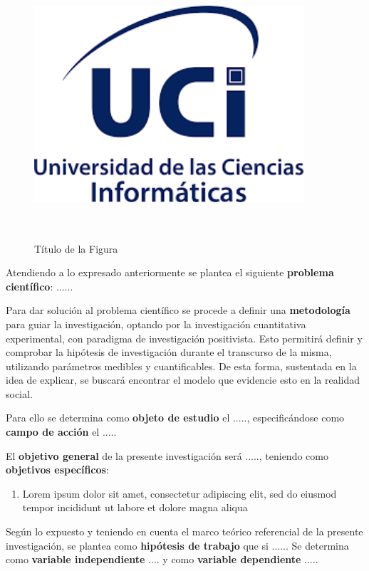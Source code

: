 \begin{figure}
	\centering
	\includegraphics[width=10cm,height=10cm]{Figuras/ucilogo.png}
	\caption{Título de la Figura}
	\label{fig:afigure}
\end{figure}

Atendiendo a lo expresado anteriormente se plantea el siguiente \textbf{problema científico}: ......

Para dar solución al problema científico se procede a definir una \textbf{metodología} para guiar la investigación, optando por la investigación cuantitativa experimental, con paradigma de investigación positivista. Esto permitirá definir y comprobar la hipótesis de investigación durante el transcurso de la misma, utilizando parámetros medibles y cuantificables. De esta forma, sustentada en la idea de explicar, se buscará encontrar el modelo que evidencie esto en la realidad social.

Para ello se determina como \textbf{objeto de estudio} el ....., especificándose como \textbf{campo de acción} el .....

El \textbf{objetivo general} de la presente investigación será ....., teniendo como \textbf{objetivos específicos}:
\begin{enumerate}
	\item Lorem ipsum dolor sit amet, consectetur adipiscing elit, sed do eiusmod tempor incididunt ut labore et dolore magna aliqua
\end{enumerate}

Según lo expuesto y teniendo en cuenta el marco teórico referencial de la presente investigación, se plantea como \textbf{hipótesis de trabajo} que si ...... Se determina como \textbf{variable independiente} .... y como \textbf{variable dependiente} .....

